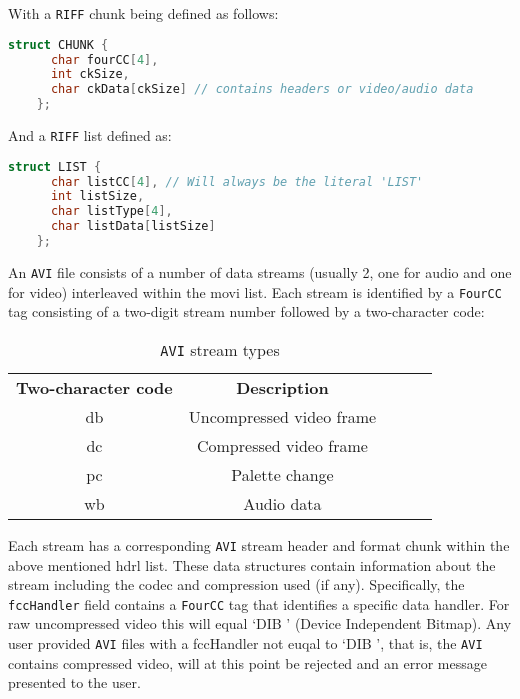 \documentclass[paper=a4, fontsize=11pt,twoside]{scrartcl}    %
\begin{document}
\noindent
With a \texttt{RIFF} chunk being defined as follows:

\begin{lstlisting}[language=C, caption={\texttt{RIFF} chunk}, frame=single]
	struct CHUNK {
	  char fourCC[4],
	  int ckSize,
	  char ckData[ckSize] // contains headers or video/audio data
	};
\end{lstlisting}

\noindent
And a \texttt{RIFF} list defined as:

\begin{lstlisting}[language=C, caption={\texttt{RIFF} list}, frame=single]
	struct LIST {
	  char listCC[4], // Will always be the literal 'LIST'
	  int listSize,
	  char listType[4],
	  char listData[listSize]
	};
\end{lstlisting}

\noindent
An \texttt{AVI} file consists of a number of data streams (usually 2, one for audio and one for video) interleaved within the movi list. Each stream is identified by a \texttt{FourCC} tag consisting of a two-digit stream number followed by a two-character code:

\begin{table}[h]
\centering
\begin{tabular}{|c|c|lll}
\cline{1-2}
\textbf{Two-character code} & \textbf{Description}       \\ \cline{1-2}
db                          & Uncompressed video frame   \\ \cline{1-2}
dc                          & Compressed video frame     \\ \cline{1-2}
pc                          & Palette change             \\ \cline{1-2}
wb                          & Audio data                 \\ \cline{1-2}
\end{tabular}
\caption{\texttt{AVI} stream types}
\end{table}

\noindent
Each stream has a corresponding \texttt{AVI} stream header and format chunk within the above mentioned hdrl list. These data structures contain information about the stream including the codec and compression used (if any). Specifically, the \texttt{fccHandler} field contains a \texttt{FourCC} tag that identifies a specific data handler. For raw uncompressed video this will equal `DIB ' (Device Independent Bitmap). Any user provided \texttt{AVI} files with a fccHandler not euqal to `DIB ', that is, the \texttt{AVI} contains compressed video, will at this point be rejected and an error message presented to the user.
\end{document}
